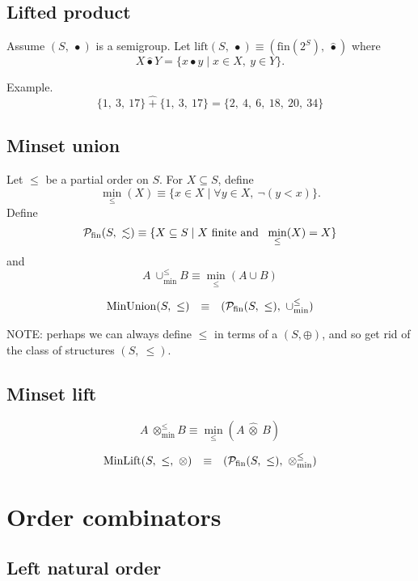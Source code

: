 \documentclass[10pt]{report}
\newcommand{\minunion}{\mathbin{\cup_{\min}^{\leq}}}
\newcommand{\minlift}{\mathbin{\otimes_{\min}^{\leq}}}
\begin{document}
\subsection{Lifted product} 

Assume $(S,\ \bullet)$ is a semigroup. 
Let 
$\mathrm{lift}(S,\ \bullet) \equiv (\mathrm{fin}(2^S),\ \hat{\bullet})$ where 
\[ 
X \hat{\bullet} Y  = \{x \bullet y \mid x\in X,\ y\in Y\}. 
\]

Example. 
\[
    \{1,\ 3,\ 17\}\ \hat{+}\ \{1,\ 3,\ 17\} = \{2,\ 4,\ 6,\ 18,\ 20,\ 34\} 
\] 

\subsection{Minset union} 

Let $\leq$ be a partial order on $S$. 
For $X \subseteq S$, define 
\[
\min_\leq(X) \equiv \{x \in X \mid \forall y \in X,\  \neg(y < x)\}. 
\] 
Define 
\[
{\cal P}_{\mathrm{fin}}(S,\ \lesssim) 
   \equiv 
\{X \subseteq S\mid \mbox{$X$ finite and \ }\min_\leq(X) = X\} 
\] 
and 
\[
  A\ \minunion B  \equiv  \min_\leq(A\cup B) 
\] 

\[ 
\begin{array}{rcl} 
\mathrm{MinUnion}(S,\ \leq)
   & \equiv 
   & ({\cal P}_{\mathrm{fin}}(S,\ \leq),\ \minunion)
\end{array} 
\] 


NOTE: perhaps we can always define $\leq$ in terms of a $(S,\oplus)$, and so 
get rid of the class of structures $(S,\ \leq)$. 

\subsection{Minset lift} 

\[
  A\ \minlift B  \equiv   \min_\leq(A \ \hat{\otimes} \ B)
\] 

\[ 
\begin{array}{rcl} 
\mathrm{MinLift}(S,\ \leq,\ \otimes)
   & \equiv 
   & ({\cal P}_{\mathrm{fin}}(S,\ \leq),\ \minlift)
\end{array} 
\]



\section{Order combinators}

\subsection{Left natural order}
\end{document}
